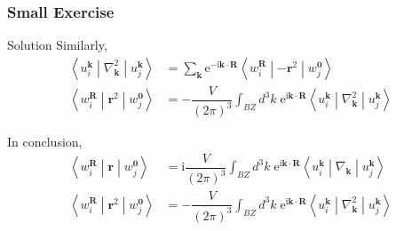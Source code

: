 \documentclass{beamer}
\begin{document}
  
  \begin{frame}
    \frametitle{Small Exercise}

    \begin{block}{Solution}
      \small 
      Similarly, 
      \begin{subequations}
        \begin{align}
          \left\langle{}u_i^{\mathbf{k}}\middle|\nabla^2_\mathbf{k}\middle|u_j^{\mathbf{k}}\right\rangle &= \sum_{\mathbf{k}}\mathrm{e}^{-\mathrm{i}\mathbf{k}\cdot\mathbf{R}}\left\langle{}w_i^{\mathbf{R}}\middle|-\mathbf{r}^2\middle|{}w_j^{\mathbf{0}}\right\rangle\\
          \left\langle{}w_i^{\mathbf{R}}\middle|\mathbf{r}^2\middle|{}w_j^{\mathbf{0}}\right\rangle &= -\dfrac{V}{(2\pi)^3}\int_{BZ}d^3k\; \mathrm{e}^{\mathrm{i}\mathbf{k}\cdot\mathbf{R}}\left\langle{}u_i^{\mathbf{k}}\middle|\nabla^2_\mathbf{k}\middle|u_j^{\mathbf{k}}\right\rangle
        \end{align}
      \end{subequations}

      In conclusion,
      \begin{equation*}
        \begin{aligned}
          \left\langle{}w_i^{\mathbf{R}}\middle|\mathbf{r}\middle|{}w_j^{\mathbf{0}}\right\rangle &= \mathrm{i}\dfrac{V}{(2\pi)^3}\int_{BZ}d^3k\; \mathrm{e}^{\mathrm{i}\mathbf{k}\cdot\mathbf{R}}\left\langle{}u_i^{\mathbf{k}}\middle|\nabla_\mathbf{k}\middle|u_j^{\mathbf{k}}\right\rangle\\
          \left\langle{}w_i^{\mathbf{R}}\middle|\mathbf{r}^2\middle|{}w_j^{\mathbf{0}}\right\rangle &= -\dfrac{V}{(2\pi)^3}\int_{BZ}d^3k\; \mathrm{e}^{\mathrm{i}\mathbf{k}\cdot\mathbf{R}}\left\langle{}u_i^{\mathbf{k}}\middle|\nabla^2_\mathbf{k}\middle|u_j^{\mathbf{k}}\right\rangle
        \end{aligned}
      \end{equation*}

    \end{block}

    \end{frame}
\end{document}
